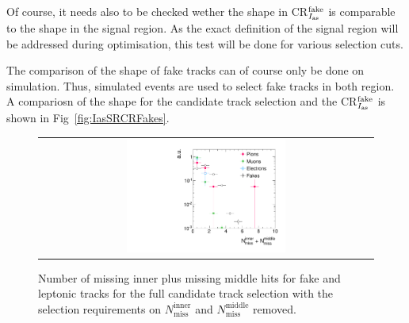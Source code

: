 Of course, it needs also to be checked wether the \ias shape in CR$_{I_{\text{as}}}^{\text{fake}}$ is comparable to the \ias shape in the signal region.
As the exact definition of the signal region will be addressed during optimisation, this test will be done for various \pt selection cuts.

The comparison of the \ias shape of fake tracks can of course only be done on simulation.
Thus, simulated \WJets events are used to select fake tracks in both region.
A compariosn of the shape for the candidate track selection and the CR$_{I_{\text{as}}}^{\text{fake}}$ is shown in Fig~\ref{fig:IasSRCRFakes}.
\begin{figure}[!t]
\vspace{20pt}
  \centering 
  \begin{tabular}{c}
    \includegraphics[width=0.49\textwidth]{figures/analysis/Background/NLostInnerPlusMiddleForAllBkg_chiTracksQCDsupressionTrigger.pdf}
  \end{tabular}
  \caption{Number of missing inner plus missing middle hits for fake and leptonic tracks for the full candidate track selection with the selection requirements on $N_{\text{miss}}^{\text{inner}}$ and $N_{\text{miss}}^{\text{middle}}$ removed.}

  \label{fig:NMissInnerAndMiddle}
\end{figure}


